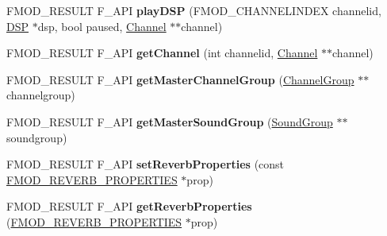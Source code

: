 \begin{DoxyCompactItemize}
\item 
\hypertarget{class_f_m_o_d_1_1_system_ac45d8b28b3b594a14f6266ccfa3bf23f}{F\-M\-O\-D\-\_\-\-R\-E\-S\-U\-L\-T F\-\_\-\-A\-P\-I {\bfseries play\-D\-S\-P} (F\-M\-O\-D\-\_\-\-C\-H\-A\-N\-N\-E\-L\-I\-N\-D\-E\-X channelid, \hyperlink{class_f_m_o_d_1_1_d_s_p}{D\-S\-P} $\ast$dsp, bool paused, \hyperlink{class_f_m_o_d_1_1_channel}{Channel} $\ast$$\ast$channel)}\label{class_f_m_o_d_1_1_system_ac45d8b28b3b594a14f6266ccfa3bf23f}

\item 
\hypertarget{class_f_m_o_d_1_1_system_ada0bf180aafd95d6311fc6b743251299}{F\-M\-O\-D\-\_\-\-R\-E\-S\-U\-L\-T F\-\_\-\-A\-P\-I {\bfseries get\-Channel} (int channelid, \hyperlink{class_f_m_o_d_1_1_channel}{Channel} $\ast$$\ast$channel)}\label{class_f_m_o_d_1_1_system_ada0bf180aafd95d6311fc6b743251299}

\item 
\hypertarget{class_f_m_o_d_1_1_system_ac175dc5bc0e78ce2b52eddff65d16411}{F\-M\-O\-D\-\_\-\-R\-E\-S\-U\-L\-T F\-\_\-\-A\-P\-I {\bfseries get\-Master\-Channel\-Group} (\hyperlink{class_f_m_o_d_1_1_channel_group}{Channel\-Group} $\ast$$\ast$channelgroup)}\label{class_f_m_o_d_1_1_system_ac175dc5bc0e78ce2b52eddff65d16411}

\item 
\hypertarget{class_f_m_o_d_1_1_system_abb21546d80d099e01c58b3c7235b345d}{F\-M\-O\-D\-\_\-\-R\-E\-S\-U\-L\-T F\-\_\-\-A\-P\-I {\bfseries get\-Master\-Sound\-Group} (\hyperlink{class_f_m_o_d_1_1_sound_group}{Sound\-Group} $\ast$$\ast$soundgroup)}\label{class_f_m_o_d_1_1_system_abb21546d80d099e01c58b3c7235b345d}

\item 
\hypertarget{class_f_m_o_d_1_1_system_afce98598bcad6bd6d27a8739545617e6}{F\-M\-O\-D\-\_\-\-R\-E\-S\-U\-L\-T F\-\_\-\-A\-P\-I {\bfseries set\-Reverb\-Properties} (const \hyperlink{struct_f_m_o_d___r_e_v_e_r_b___p_r_o_p_e_r_t_i_e_s}{F\-M\-O\-D\-\_\-\-R\-E\-V\-E\-R\-B\-\_\-\-P\-R\-O\-P\-E\-R\-T\-I\-E\-S} $\ast$prop)}\label{class_f_m_o_d_1_1_system_afce98598bcad6bd6d27a8739545617e6}

\item 
\hypertarget{class_f_m_o_d_1_1_system_a05177df319c03309058e450c4cc767af}{F\-M\-O\-D\-\_\-\-R\-E\-S\-U\-L\-T F\-\_\-\-A\-P\-I {\bfseries get\-Reverb\-Properties} (\hyperlink{struct_f_m_o_d___r_e_v_e_r_b___p_r_o_p_e_r_t_i_e_s}{F\-M\-O\-D\-\_\-\-R\-E\-V\-E\-R\-B\-\_\-\-P\-R\-O\-P\-E\-R\-T\-I\-E\-S} $\ast$prop)}\label{class_f_m_o_d_1_1_system_a05177df319c03309058e450c4cc767af}


\end{DoxyCompactItemize}
